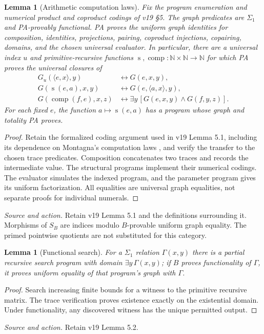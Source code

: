 \documentclass[11pt]{article}
\newtheorem{lemma}[theorem]{Lemma}
\theoremstyle{definition}\newtheorem{definition}[theorem]{Definition}
\newcommand{\N}{\mathbb N}
\newcommand{\source}[1]{\par\smallskip\noindent\textit{Source and action.} #1\par\smallskip}
\begin{document}
\begin{lemma}[Arithmetic computation laws]\label{lem:computation}
Fix the program enumeration and numerical product and coproduct
codings of v19 \S5. The graph predicates are $\Sigma_1$ and
PA-provably functional. PA proves the uniform graph identities for
composition, identities, projections, pairing, coproduct injections,
copairing, domains, and the chosen universal evaluator. In particular,
there are a universal index $u$ and primitive-recursive functions
$\operatorname{s},\operatorname{comp}:\N\times\N\to\N$ for which
PA proves the universal closures of
\[
\begin{aligned}
G_u(\langle e,x\rangle,y)&\leftrightarrow G(e,x,y),\\
G(\operatorname{s}(e,a),x,y)&\leftrightarrow G(e,\langle a,x\rangle,y),\\
G(\operatorname{comp}(f,e),x,z)&\leftrightarrow
 \exists y\,[G(e,x,y)\land G(f,y,z)].
\end{aligned}
\]
For each fixed $e$, the function $a\mapsto\operatorname{s}(e,a)$
has a program whose graph and totality PA proves.
\end{lemma}
\begin{proof}
Retain the formalized coding argument used in v19 Lemma 5.1,
including its dependence on Montagna's computation laws
\cite{Montagna}, and verify the transfer to the chosen trace predicates.
Composition concatenates two traces and records the intermediate
value. The structural programs implement their numerical codings.
The evaluator simulates the indexed program, and the parameter
program gives its uniform factorization. All equalities are universal
graph equalities, not separate proofs for individual numerals.
\end{proof}
\source{Retain v19 Lemma 5.1 and the definitions surrounding it. Morphisms of $S_B$ are indices modulo $B$-provable uniform graph equality. The primed pointwise quotients are not substituted for this category.}

\begin{lemma}[Functional search]\label{lem:search}
For a $\Sigma_1$ relation $\Gamma(x,y)$ there is a partial recursive
search program with domain $\exists y\,\Gamma(x,y)$; if $B$ proves
functionality of $\Gamma$, it proves uniform equality of that
program's graph with $\Gamma$.
\end{lemma}
\begin{proof}
Search increasing finite bounds for a witness to the primitive
recursive matrix. The trace verification proves existence exactly
on the existential domain. Under functionality, any discovered
witness has the unique permitted output.
\end{proof}
\source{Retain v19 Lemma 5.2.}
\end{document}
